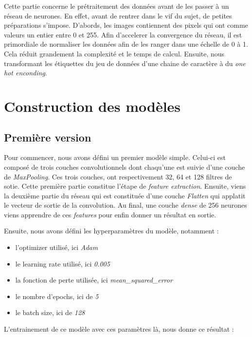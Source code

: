 \documentclass[12pt,titlepage]{article}
\begin{document}
Cette partie concerne le prétraitement des données avant de les passer à un réseau de neurones. En effet, avant de rentrer dans le vif du sujet, de petites préparations s'impose. D'abords, les images contiennent des pixels qui ont comme valeurs un entier entre 0 et 255. Afin d'accelerer la convergence du réseau, il est primordiale de normaliser les données afin de les ranger dans une échelle de 0 à 1. Cela réduit grandement la complexité et le temps de calcul. Ensuite, nous transformant les étiquettes du jeu de données d'une chaine de caractère à du \textit{one hot enconding}.

\section{Construction des modèles}

\subsection{Première version}

Pour commencer, nous avons défini un premier modèle simple. Celui-ci est composé de trois couches convolutionnels dont chaqu'une est suivie d'une couche de \textit{MaxPooling}. Ces trois couches, ont respectivement 32, 64 et 128 filtres de sotie. Cette première partie constitue l'étape de \textit{feature extraction}. Ensuite, viens la deuxième partie du réseau qui est constituée d'une couche \textit{Flatten} qui applatit le vecteur de sortie de la convolution. Au final, une couche \textit{dense} de 256 neurones viens apprendre de ces \textit{features} pour enfin donner un résultat en sortie.

Ensuite, nous avons défini les hyperparamètres du modèle, notamment : 

\begin{itemize}
  \item l'optimizer utilisé, ici \textit{Adam}
  \item le learning rate utilisé, ici \textit{0.005}
  \item la fonction de perte utilisée, ici \textit{mean\_squared\_error}
  \item le nombre d'epochs, ici de \textit{5}
  \item le batch size, ici de \textit{128}
\end{itemize}

L'entrainement de ce modèle avec ces paramètres là, nous donne ce résultat : 
\end{document}
